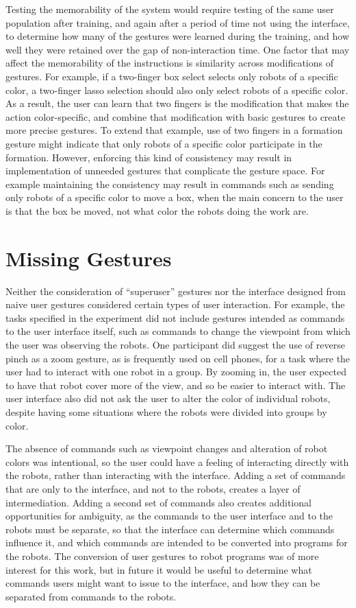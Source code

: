 Testing the memorability of the system would require testing of the same user population after training, and again after a period of time not using the interface, to determine how many of the gestures were learned during the training, and how well they were retained over the gap of non-interaction time. 
One factor that may affect the memorability of the instructions is similarity across modifications of gestures. 
For example, if a two-finger box select selects only robots of a specific color, a two-finger lasso selection should also only select robots of a specific color. 
As a result, the user can learn that two fingers is the modification that makes the action color-specific, and combine that modification with basic gestures to create more precise gestures. 
To extend that example, use of two fingers in a formation gesture might indicate that only robots of a specific color participate in the formation. 
However, enforcing this kind of consistency may result in implementation of unneeded gestures that complicate the gesture space. 
For example maintaining the consistency may result in commands such as sending only robots of a specific color to move a box, when the main concern to the user is that the box be moved, not what color the robots doing the work are.  

\section{Missing Gestures}

Neither the consideration of ``superuser'' gestures nor the interface designed from naive user gestures considered certain types of user interaction. For example, the tasks specified in the experiment did not include gestures intended as commands to the user interface itself, such as commands to change the viewpoint from which the user was observing the robots. 
One participant did suggest the use of reverse pinch as a zoom gesture, as is frequently used on cell phones, for a task where the user had to interact with one robot in a group. 
By zooming in, the user expected to have that robot cover more of the view, and so be easier to interact with. 
The user interface also did not ask the user to alter the color of individual robots, despite having some situations where the robots were divided into groups by color. 

The absence of commands such as viewpoint changes and alteration of robot colors was intentional, so the user could have a feeling of interacting directly with the robots, rather than interacting with the interface. 
Adding a set of commands that are only to the interface, and not to the robots, creates a layer of intermediation. 
Adding a second set of commands also creates additional opportunities for ambiguity, as the commands to the user interface and to the robots must be separate, so that the interface can determine which commands influence it, and which commands are intended to be converted into programs for the robots. 
The conversion of user gestures to robot programs was of more interest for this work, but in future it would be useful to determine what commands users might want to issue to the interface, and how they can be separated from commands to the robots. 

